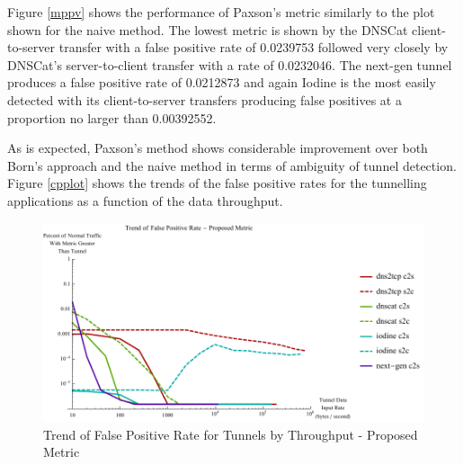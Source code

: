 \documentclass[12pt]{report}
\theoremstyle{remark}
\theoremstyle{definition}
\theoremstyle{definition}
\theoremstyle{definition}
\begin{document}
Figure \ref{mppv} shows the performance of Paxson's metric similarly to the plot
shown for the naive method. The lowest metric is shown by the DNSCat
client-to-server transfer with a false positive rate of 0.0239753 followed very closely by
DNSCat's server-to-client transfer with a rate of 0.0232046. The next-gen tunnel
produces a false positive rate of 0.0212873 and again Iodine is the most easily
detected with its client-to-server transfers producing false positives at a
proportion no larger than 0.00392552.

As is expected, Paxson's method shows considerable improvement over both
Born's approach and the naive method in terms of ambiguity of tunnel detection.
Figure \ref{cpplot} shows the trends of the false positive rates for the
tunnelling applications as a function of the data throughput.

\begin{figure}
\centering
\includegraphics[width=\textwidth]{../figures/chplot.pdf}
\caption[Trend of False Positive Rate for Tunnels by Throughput - Proposed Metric]{Trend
 of False Positive Rate for Tunnels by Throughput - Proposed Metric}
\label{chplot}
\end{figure}
\end{document}
